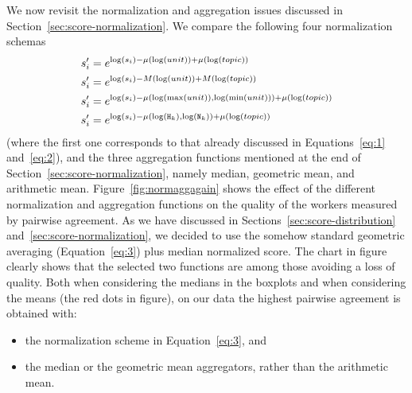 We now revisit the normalization and
aggregation issues discussed in
Section~\ref{sec:score-normalization}. We compare the following four normalization
schemas
\begin{align}
  s'_i &= e^{\log(s_i) - \mu(\log(\mathnormal{unit})) + \mu
         (\log(\mathnormal{topic})) } \label{eq:3}\\
  s'_i &= e^{\log(s_i) - M(\log(\mathnormal{unit})) +
         \mathnormal{M}(\log(\mathnormal{topic}))} \label{eq:4}\\
  s'_i &= e^{\log(s_i) - \mu (\log( \max (\mathnormal{unit})),\log(
         \min (\mathnormal{unit}))) + \mu(\log(\mathnormal{topic}))
         } \label{eq:5} \\
  s'_i &= e^{\log(s_i) - \mu(\log(\mathtt{H}_k),\log(\mathtt{N}_k)) +
         \mu (\log(\mathnormal{topic}))} \label{eq:6}
\end{align}
(where the first one corresponds to that already discussed in
Equations~\eqref{eq:1} and~\eqref{eq:2}), 
and the three aggregation
functions mentioned at the end of
Section~\ref{sec:score-normalization}, namely median, geometric mean,
and arithmetic mean.
Figure~\ref{fig:normaggagain} shows the effect of the different
normalization and aggregation functions on the quality of the workers
measured by pairwise agreement. 
As we have discussed in Sections~\ref{sec:score-distribution}
and~\ref{sec:score-normalization}, we decided to use the somehow
standard geometric averaging (Equation~\eqref{eq:3}) plus median
normalized score. 
The chart in figure clearly shows that the selected two functions are
among those avoiding a loss of quality. 
Both when considering the medians in the boxplots and when considering
the means (the red dots in figure), on our data the highest pairwise
agreement is obtained with:
  \begin{itemize}
  \item the normalization scheme in Equation~\eqref{eq:3}, and
  \item the median or the geometric mean aggregators, rather than
    the arithmetic mean. 
  \end{itemize}




